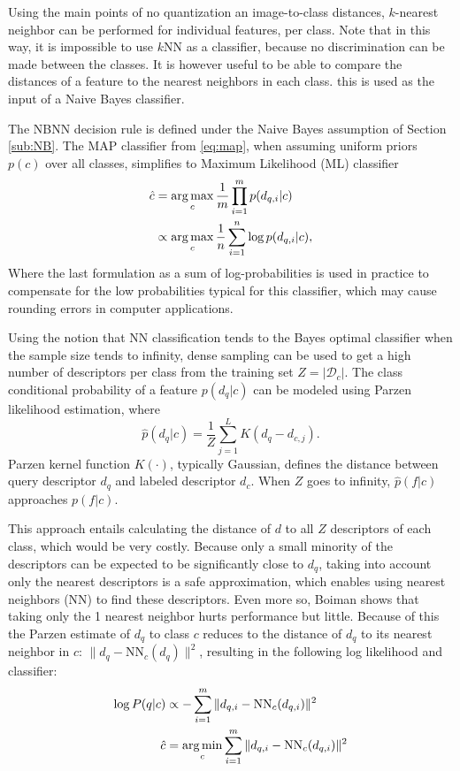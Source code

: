 Using the main points of no quantization an image-to-class distances, $k$-nearest neighbor can be performed for individual features, per class. Note that in this way, it is impossible to use $k$NN as a classifier, because no discrimination can be made between the classes. It is however useful to be able to compare the distances of a feature to the nearest neighbors in each class. this is used as the input of a Naive Bayes classifier.


The NBNN decision rule is defined under the Naive Bayes assumption of Section \ref{sub:NB}. The MAP classifier from \eqref{eq:map}, when assuming uniform priors $p(c)$ over all classes, simplifies to Maximum Likelihood (ML) classifier 
\begin{align}
    \hat c &= \operatorname*{arg\,max}_c \frac{1}{m}\prod_{i=1}^{m} p(d_{q,i}|c)\\
           &\propto \operatorname*{arg\,max}_c \frac{1}{n}\sum_{i=1}^{n} \log p(d_{q,i}|c),
\end{align}
Where the last formulation as a sum of log-probabilities is used in practice to compensate for the low probabilities typical for this classifier, which may cause rounding errors in computer applications.

Using the notion that NN classification tends to the Bayes optimal classifier when the sample size tends to infinity\cite{cover1967nearest, boiman2008defense}, dense sampling can be used to get a high number of descriptors per class from the training set $Z = |\mathcal{D}_c|$. The class conditional probability of a feature $p(d_q|c)$ can be modeled using Parzen likelihood estimation, where
\begin{equation} \label{eq:parzen}
    \hat p(d_q|c) = \frac{1}{Z}\sum_{j=1}^L K(d_q-d_{c,j}).
\end{equation}
Parzen kernel function $K(\cdot)$, typically Gaussian, defines the distance between query descriptor $d_{q}$ and labeled descriptor $d_{c}$. When $Z$ goes to infinity, $\hat p(f|c)$ approaches $p(f|c)$. 

This approach entails calculating the distance of $d$ to all $Z$ descriptors of each class, which would be very costly. Because only a small minority of the descriptors can be expected to be significantly close to $d_q$, taking into account only the nearest descriptors is a safe approximation, which enables using nearest neighbors (NN) to find these descriptors. Even more so, Boiman shows that taking only the 1 nearest neighbor hurts performance but little. Because of this the Parzen estimate of $d_q$ to class $c$ reduces to the distance of $d_q$ to its nearest neighbor in $c$: $\|d_q - \text{NN}_c(d_q)\|^2$, resulting in the following log likelihood and classifier: 
\begin{align}
    \label{eq:nbnnloglikelihood}
    \log P(q|c) &\propto -\sum_{i=1}^m \|d_{q,i} - \text{NN}_c(d_{q,i})\|^2 \\
    \label{eq:nbnnclass}
    \hat c      &= \operatorname*{arg\,min}_c \sum_{i=1}^m \|d_{q,i} - \text{NN}_c(d_{q,i})\|^2
\end{align}

